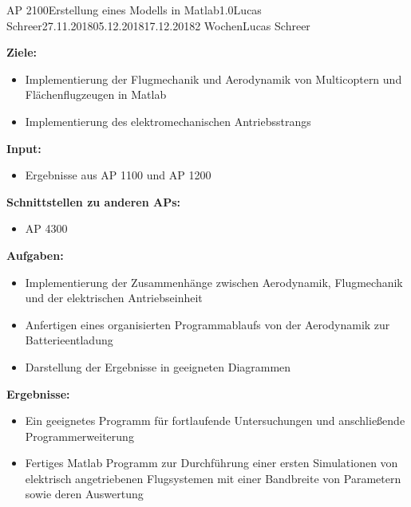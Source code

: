 \clearpage
\begin{wpd}{AP 2100}{Erstellung eines Modells in Matlab}{1.0}{Lucas Schreer}{27.11.2018}{05.12.2018}{17.12.2018}{2 Wochen}{Lucas Schreer}
    {
    \textbf{Ziele:}
    \begin{itemize}
        \item Implementierung der Flugmechanik und Aerodynamik von Multicoptern und Flächenflugzeugen in Matlab
        \item Implementierung des elektromechanischen Antriebsstrangs
    \end{itemize}
    \textbf{Input:}
    \begin{itemize}
        \item Ergebnisse aus AP 1100 und AP 1200
    \end{itemize}
    \textbf{Schnittstellen zu anderen APs:}
    \begin{itemize}
        \item AP 4300
    \end{itemize}
    \textbf{Aufgaben:}
    \begin{itemize}
    	\item Implementierung der Zusammenhänge zwischen Aerodynamik, Flugmechanik und der elektrischen Antriebseinheit
    	\item Anfertigen eines organisierten Programmablaufs von der Aerodynamik zur Batterieentladung
    	\item Darstellung der Ergebnisse in geeigneten Diagrammen
    \end{itemize}
    \textbf{Ergebnisse:}
    \begin{itemize}
        \item Ein geeignetes Programm für fortlaufende Untersuchungen und anschließende Programmerweiterung
        \item Fertiges Matlab Programm zur Durchführung einer ersten Simulationen von elektrisch angetriebenen Flugsystemen mit einer Bandbreite von Parametern sowie deren Auswertung
    \end{itemize}
    }
\end{wpd}


